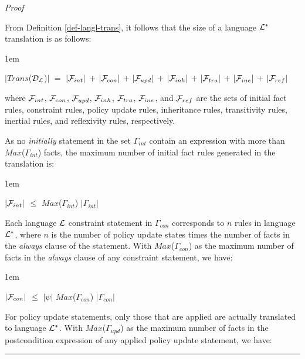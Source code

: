 \documentclass[11pt]{report}
\newenvironment{vproof}
{
  \noindent
  {\em Proof}\hspace{0.5em}
}
{

  \noindent
  \rule{0.5em}{0.5em}
}
\newenvironment{vquote}
{
  \begin{list}{}{\leftmargin 1em}\item[]
}
{
  \end{list}
}
\begin{document}
          \begin{vproof}
            From Definition \ref{def-langl-trans}, it follows that the size of
            a language ${\cal L}^{*}$ translation is as follows:

            \begin{vquote}
              $|$$Trans$(${\cal D_{L}}$)$|$ $=$
                $|{\cal F}_{int}|$ $+$
                $|{\cal F}_{con}|$ $+$
                $|{\cal F}_{upd}|$ $+$
                $|{\cal F}_{inh}|$ $+$
                $|{\cal F}_{tra}|$ $+$
                $|{\cal F}_{ine}|$ $+$
                $|{\cal F}_{ref}|$
            \end{vquote}

            \noindent
            where ${\cal F}_{int}$, ${\cal F}_{con}$, ${\cal F}_{upd}$,
            ${\cal F}_{inh}$, ${\cal F}_{tra}$, ${\cal F}_{ine}$, and
            ${\cal F}_{ref}$ are the sets of initial fact rules, constraint
            rules, policy update rules, inheritance rules, transitivity rules,
            inertial rules, and reflexivity rules, respectively.

            As no {\em initially} statement in the set $\Gamma_{int}$ contain
            an expression with more than $Max$($\Gamma_{int}$) facts, the
            maximum number of initial fact rules generated in the translation
            is:

            \begin{vquote}
              $|{\cal F}_{int}|$ $\leq$
                $Max$($\Gamma_{int}$) $|\Gamma_{int}|$
            \end{vquote}

            Each language ${\cal L}$ constraint statement in $\Gamma_{con}$
            corresponds to $n$ rules in language ${\cal L}^{*}$, where $n$ is
            the number of policy update states times the number of facts in the
            {\em always} clause of the statement. With $Max$($\Gamma_{con}$) as
            the maximum number of facts in the {\em always} clause of any
            constraint statement, we have:

            \begin{vquote}
              $|{\cal F}_{con}|$ $\leq$
                $|\psi|$ $Max$($\Gamma_{con}$) $|\Gamma_{con}|$
            \end{vquote}

            For policy update statements, only those that are applied are
            actually translated to language ${\cal L}^{*}$. With
            $Max$($\Gamma_{upd}$) as the maximum number of facts in the
            postcondition expression of any applied policy update statement, we
            have:


\end{vproof}
\end{document}
